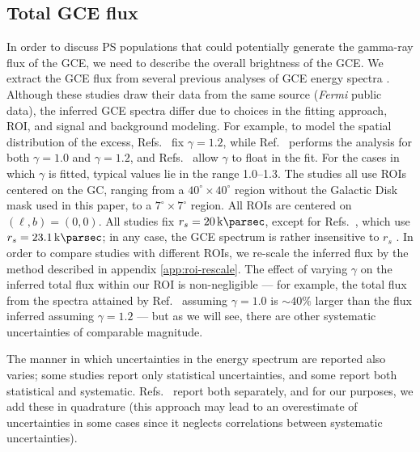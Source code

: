 \documentclass[letter,11pt]{article}
\begin{document}
\subsection{Total GCE flux}
\label{sec:total-flux}

In order to discuss PS populations that could potentially generate the gamma-ray flux of the GCE, we need to describe the overall brightness of the GCE. We extract the GCE flux from several previous analyses of GCE energy spectra \cite{Zhong:2019ycb, Calore:2014xka, DiMauro:2021raz, Abazajian:2014fta, Gordon13, Ajello:2015kwa, Ajello:2017opo}. Although these studies draw their data from the same source (\textit{Fermi} public data), the inferred GCE spectra differ due to choices in the fitting approach, ROI, and signal and background modeling. For example, to model the spatial distribution of the excess, Refs.~\cite{Calore:2014xka, Gordon13, Ajello:2015kwa} fix $\gamma=1.2$, while Ref.~\cite{Zhong:2019ycb} performs the analysis for both $\gamma=1.0$ and $\gamma=1.2$, and Refs.~\cite{DiMauro:2021raz, Ajello:2017opo, Abazajian:2014fta} allow $\gamma$ to float in the fit. For the cases in which $\gamma$ is fitted, typical values lie in the range 1.0--1.3.
The studies all use ROIs centered on the GC, ranging from a $40^\circ \times 40^\circ$ region without the Galactic Disk mask used in this paper, to a $7^\circ \times 7^\circ$ region. All ROIs are centered on $(\ell, b)=(0, 0)$. All studies fix $r_s=\SI{20}{\kilo\parsec}$, except for Refs.~\cite{Abazajian:2014fta, Gordon13}, which use $r_s=\SI{23.1}{\kilo\parsec}$; in any case, the GCE spectrum is rather insensitive to $r_s$ \cite{DiMauro:2021raz}. In order to compare studies with different ROIs, we re-scale the inferred flux by the method described in appendix \ref{app:roi-rescale}. The effect of varying $\gamma$ on the inferred total flux within our ROI is non-negligible --- for example, the total flux from the spectra attained by Ref.~\cite{Zhong:2019ycb} assuming $\gamma=1.0$ is $\sim40\%$ larger than the flux inferred assuming $\gamma=1.2$ --- but as we will see, there are other systematic uncertainties of comparable magnitude.

The manner in which uncertainties in the energy spectrum are reported also varies; some studies report only statistical uncertainties, and some report both statistical and systematic. Refs.~\cite{Calore:2014xka, Gordon13, DiMauro:2021raz} report both separately, and for our purposes, we add these in quadrature (this approach may lead to an overestimate of uncertainties in some cases since it neglects correlations between systematic uncertainties).
\end{document}
